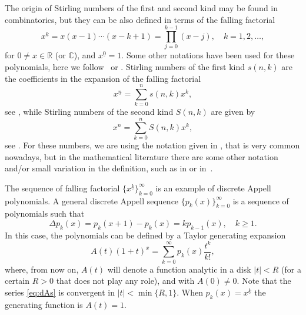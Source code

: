 \documentclass[11pt,a4paper]{article}
\theoremstyle{plain}
\theoremstyle{remark}
\newcommand{\RR}{\mathbb{R}}
\newcommand{\CC}{\mathbb{C}}
\begin{document}
The origin of Stirling numbers of the first and second kind may be found in combinatorics, but they can be also defined in terms of the falling factorial 
\begin{equation*}
  x^{\underline{k}} = x(x-1)  \cdots (x-k+1) = \prod_{j=0}^{k-1} (x-j),
  \quad k = 1,2,\ldots,
\end{equation*}
for $0\ne x\in\RR$ (or $\CC$), and $x^{\underline{0}}=1$. Some other notations have been used
for these polynomials, here we follow~\cite{Knuth} or \cite[Section~2.6, p.~47]{GKP}. Stirling numbers of the first kind $s(n,k)$ are the coefficients in the expansion of the falling factorial
\begin{equation}
\label{eq:Stirling}
  x^{\underline{n}} = \sum_{k=0}^n s(n,k)x^k,
\end{equation}
see \cite[\S\,50, (3)]{Jor2}, while Stirling numbers of the second kind $S(n,k)$ are given by 
\begin{equation}
\label{eq:Stirling-second}
  x^n = \sum_{k=0}^n S(n,k) x^{\underline{k}},
\end{equation}
see \cite[\S\,58, (2)]{Jor2}. 
For these numbers, we are using the notation given in \cite{Br-NIST}, that is very common nowadays, but in the mathematical literature there are some other notation and/or small variation in the definition, such as in \cite{Jor2} or in~\cite{GKP}.

The sequence of falling factorial $\{x^{\underline{k}}\}_{k=0}^{\infty}$ is an example of discrete Appell polynomials. A general discrete Appell sequence $\{p_k(x)\}_{k=0}^{\infty}$ is a sequence of polynomials such that 
\begin{equation}
\label{eq:Adiscrete}
  \Delta p_k(x)=p_k(x+1) - p_k(x) = k p_{k-1}(x), \quad k \ge 1.
\end{equation}
In this case, the polynomials can be defined by a Taylor generating expansion 
\begin{equation}
\label{eq:dAs}
  A(t)(1+t)^x = \sum_{k=0}^{\infty} p_k(x) \frac{t^k}{k!},
\end{equation}
where, from now on, $A(t)$ will denote a function analytic in a disk $|t|<R$ (for a certain $R>0$ that does not play any role), and with $A(0) \ne 0$. Note that the series \eqref{eq:dAs} is convergent in $|t|<\min\{R,1\}$.  When $p_k(x)=x^{\underline{k}}$ the generating function is $A(t)=1$. 
\end{document}
